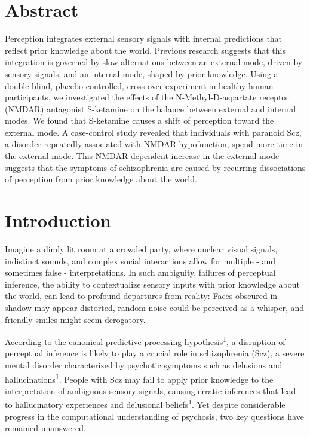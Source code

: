 \documentclass[
]{article}
\begin{document}
\newpage

\linenumbers

\section{Abstract}\label{abstract}

Perception integrates external sensory signals with internal predictions
that reflect prior knowledge about the world. Previous research suggests
that this integration is governed by slow alternations between an
external mode, driven by sensory signals, and an internal mode, shaped
by prior knowledge. Using a double-blind, placebo-controlled, cross-over
experiment in healthy human participants, we investigated the effects of
the N-Methyl-D-aspartate receptor (NMDAR) antagonist S-ketamine on the
balance between external and internal modes. We found that S-ketamine
causes a shift of perception toward the external mode. A case-control
study revealed that individuals with paranoid Scz, a disorder repeatedly
associated with NMDAR hypofunction, spend more time in the external
mode. This NMDAR-dependent increase in the external mode suggests that
the symptoms of schizophrenia are caused by recurring dissociations of
perception from prior knowledge about the world.

\section{Introduction}\label{introduction}

Imagine a dimly lit room at a crowded party, where unclear visual
signals, indistinct sounds, and complex social interactions allow for
multiple - and sometimes false - interpretations. In such ambiguity,
failures of perceptual inference, the ability to contextualize sensory
inputs with prior knowledge about the world, can lead to profound
departures from reality: Faces obscured in shadow may appear distorted,
random noise could be perceived as a whisper, and friendly smiles might
seem derogatory.

According to the canonical predictive processing
hypothesis\textsuperscript{1}, a disruption of perceptual inference is
likely to play a crucial role in schizophrenia (Scz), a severe mental
disorder characterized by psychotic symptoms such as delusions and
hallucinations\textsuperscript{1}. People with Scz may fail to apply
prior knowledge to the interpretation of ambiguous sensory signals,
causing erratic inferences that lead to hallucinatory experiences and
delusional beliefs\textsuperscript{1}. Yet despite considerable progress
in the computational understanding of psychosis, two key questions have
remained unanswered.
\end{document}
